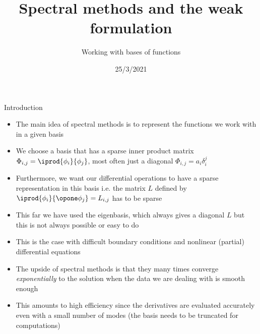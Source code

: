 

\title{Spectral methods and the weak formulation}
\subtitle{Working with bases of functions}
\date{25/3/2021}
\date{}


	
	\maketitle
	
	
\begin{frame}{Introduction}
	\begin{itemize}[<+->]
		\item The main idea of spectral methods is to represent the functions we work with in a given basis
		\item We choose a basis that has a sparse inner product matrix $ \Phi_{i,j} = \iprod{\phi_i}{\phi_j} $, most often just a diagonal $ \Phi_{i,j} = a_i \delta_{i}^{j} $
		\item Furthermore, we want our differential operations to have a sparse representation in this basis i.e. the matrix $ L $ defined by $ \iprod{\phi_i}{\opone \phi_j} =  L_{i,j} $ has to be sparse
		\item This far we have used the eigenbasis, which always gives a diagonal $ L $ but this is not always possible or easy to do
		\item This is the case with difficult boundary conditions and nonlinear (partial) differential equations
		\item The upside of spectral methods is that they many times converge \emph{exponentially} to the solution when the data we are dealing with is smooth enough
		\item This amounts to high efficiency since the derivatives are evaluated accurately even with a small number of modes (the basis needs to be truncated for computations)
	\end{itemize}
\end{frame}

